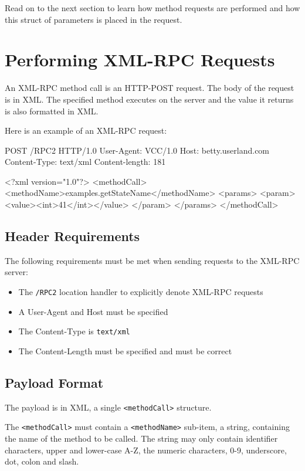 Read on to the next section to learn how method requests are performed and how
this struct of parameters is placed in the request.


\section{Performing XML-RPC Requests}

An XML-RPC method call is an HTTP-POST request. The body of the request is in
XML. The specified method executes on the server and the value it returns is
also formatted in XML.

Here is an example of an XML-RPC request:

\begin{lstverbatim}
POST /RPC2 HTTP/1.0
User-Agent: VCC/1.0
Host: betty.userland.com
Content-Type: text/xml
Content-length: 181

<?xml version="1.0"?>
<methodCall>
  <methodName>examples.getStateName</methodName>
  <params>
    <param>
      <value><int>41</int></value>
    </param>
  </params>
</methodCall>
\end{lstverbatim}


\subsection{Header Requirements}

The following requirements must be met when sending requests to the XML-RPC
server:

\begin{itemize}
\item The \verb,/RPC2, location handler to explicitly denote XML-RPC requests
\item A User-Agent and Host must be specified
\item The Content-Type is \verb,text/xml,
\item The Content-Length must be specified and must be correct
\end{itemize}


\subsection{Payload Format}

The payload is in XML, a single \verb,<methodCall>, structure.

The \verb,<methodCall>, must contain a \verb,<methodName>, sub-item, a
string, containing the name of the method to be called. The string may only
contain identifier characters, upper and lower-case A-Z, the numeric
characters, 0-9, underscore, dot, colon and slash.

